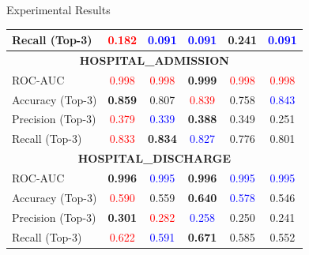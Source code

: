 \documentclass[final]{beamer}
\newlength{\colwidth}
\begin{document}
\begin{frame}[t]
\begin{columns}[t]
\begin{column}{\colwidth}
\begin{block}{Experimental Results}
\begin{table}[htbp]
\begin{tabular}{|l|c|c|c|c|c|}
    Recall (Top-3) & \textcolor{red}{0.182} & \textcolor{blue}{0.091} & \textcolor{blue}{0.091} & \textbf{0.241} & \textcolor{blue}{0.091} \\
    \hline
    \hline
    \multicolumn{6}{|c|}{\textbf{HOSPITAL\_ADMISSION}} \\
    \hline
    ROC-AUC & \textcolor{red}{0.998} & \textcolor{red}{0.998} & \textbf{0.999} & \textcolor{red}{0.998} & \textcolor{red}{0.998} \\
    Accuracy (Top-3) & \textbf{0.859} & 0.807 & \textcolor{red}{0.839} & 0.758 & \textcolor{blue}{0.843} \\
    Precision (Top-3) & \textcolor{red}{0.379} & \textcolor{blue}{0.339} & \textbf{0.388} & 0.349 & 0.251 \\
    Recall (Top-3) & \textcolor{red}{0.833} & \textbf{0.834} & \textcolor{blue}{0.827} & 0.776 & 0.801\\
    \hline
    \hline
    \multicolumn{6}{|c|}{\textbf{HOSPITAL\_DISCHARGE}} \\
    \hline
    ROC-AUC & \textbf{0.996} & \textcolor{blue}{0.995} & \textbf{0.996} & \textcolor{blue}{0.995} & \textcolor{blue}{0.995} \\
    Accuracy (Top-3) & \textcolor{red}{0.590} & 0.559 & \textbf{0.640} & \textcolor{blue}{0.578} & 0.546 \\
    Precision (Top-3) & \textbf{0.301} & \textcolor{red}{0.282} & \textcolor{blue}{0.258} & 0.250 & 0.241 \\
    Recall (Top-3) & \textcolor{red}{0.622} & \textcolor{blue}{0.591} & \textbf{0.671} & 0.585 & 0.552 \\
    \hline
    \end{tabular}
    \end{table}
    
 
    
  \end{block}

    


\end{column}
\end{columns}
\end{frame}
\end{document}

